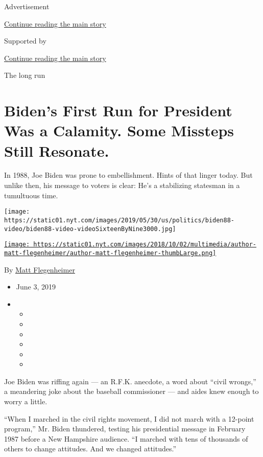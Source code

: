 Advertisement

\protect\hyperlink{after-top}{Continue reading the main story}

Supported by

\protect\hyperlink{after-sponsor}{Continue reading the main story}

The long run

\hypertarget{bidens-first-run-for-president-was-a-calamity-some-missteps-still-resonate}{%
\section{Biden's First Run for President Was a Calamity. Some Missteps
Still
Resonate.}\label{bidens-first-run-for-president-was-a-calamity-some-missteps-still-resonate}}

In 1988, Joe Biden was prone to embellishment. Hints of that linger
today. But unlike then, his message to voters is clear: He's a
stabilizing statesman in a tumultuous time.

\texttt{[image: https://static01.nyt.com/images/2019/05/30/us/politics/biden88-video/biden88-video-videoSixteenByNine3000.jpg]}

\href{https://www.nytimes.com/by/matt-flegenheimer}{\texttt{[image: https://static01.nyt.com/images/2018/10/02/multimedia/author-matt-flegenheimer/author-matt-flegenheimer-thumbLarge.png]}}

By \href{https://www.nytimes.com/by/matt-flegenheimer}{Matt
Flegenheimer}

\begin{itemize}
\item
  June 3, 2019
\item
  \begin{itemize}
  \item
  \item
  \item
  \item
  \item
  \item
  \end{itemize}
\end{itemize}

Joe Biden was riffing again --- an R.F.K. anecdote, a word about ``civil
wrongs,'' a meandering joke about the baseball commissioner --- and
aides knew enough to worry a little.

``When I marched in the civil rights movement, I did not march with a
12-point program,'' Mr. Biden thundered, testing his presidential
message in February 1987 before a New Hampshire audience. ``I marched
with tens of thousands of others to change attitudes. And we changed
attitudes.''

